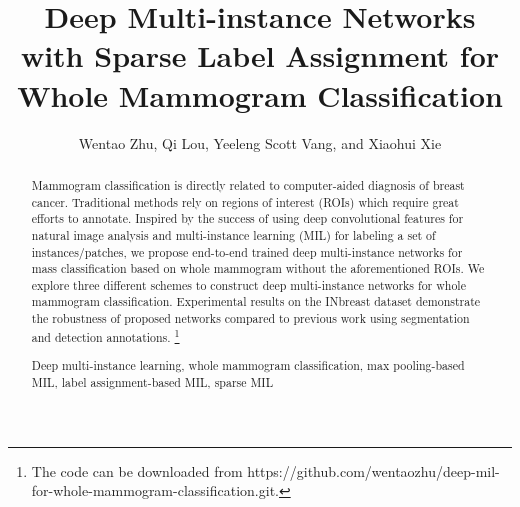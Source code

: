 \documentclass[runningheads,a4paper]{llncs}
\newcommand{\keywords}[1]{\par\addvspace\baselineskip
\noindent\keywordname\enspace\ignorespaces#1}
\begin{document}
\mainmatter  %

\title{Deep Multi-instance Networks with Sparse Label Assignment for Whole Mammogram Classification}


\author{Wentao Zhu, Qi Lou, Yeeleng Scott Vang, and Xiaohui Xie} 
\maketitle
\begin{abstract}
  Mammogram classification is directly related to computer-aided diagnosis of breast cancer. Traditional methods rely on regions of interest (ROIs) which require great efforts to annotate. Inspired by the success of using deep convolutional features for natural image analysis and multi-instance learning (MIL) for labeling a set of instances/patches, we propose end-to-end trained deep multi-instance networks for mass classification based on whole mammogram without the aforementioned ROIs. We explore three different schemes to construct deep multi-instance networks for whole mammogram classification. Experimental results on the INbreast dataset demonstrate the robustness of proposed networks compared to previous work using segmentation and detection annotations. \footnote[1]{The code can be downloaded from https://github.com/wentaozhu/deep-mil-for-whole-mammogram-classification.git.}
\keywords{Deep multi-instance learning, whole mammogram classification, max pooling-based MIL, label assignment-based MIL, sparse MIL} %
\end{abstract}
\end{document}
